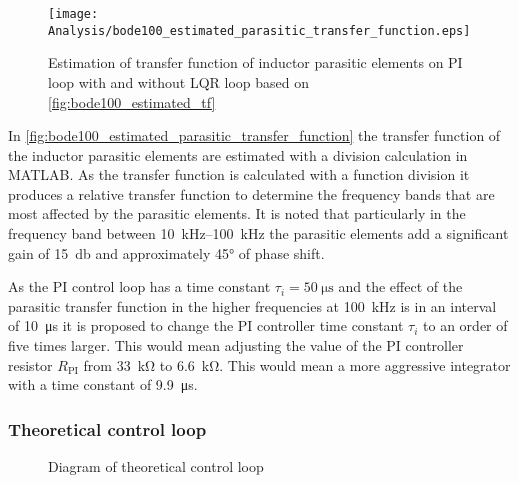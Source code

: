 \begin{figure}[htbp]
	\centering
	\texttt{[image: Analysis/bode100\_estimated\_parasitic\_transfer\_function.eps]}
	\caption{Estimation of transfer function of inductor parasitic elements on PI loop with and without LQR loop based on \autoref{fig:bode100_estimated_tf}}
	\label{fig:bode100_estimated_parasitic_transfer_function}
\end{figure}
In \autoref{fig:bode100_estimated_parasitic_transfer_function} the transfer function of the inductor parasitic elements are estimated with a division calculation in MATLAB. As the transfer function is calculated with a function division it produces a relative transfer function to determine the frequency bands that are most affected by the parasitic elements. It is noted that particularly in the frequency band between \SIrange[scientific-notation = engineering]{10}{100}{\kilo\hertz} the parasitic elements add a significant gain of \SI{15}{\decibel} and approximately \ang{45} of phase shift. 

As the PI control loop has a time constant $\tau_{i} = \SI{50}{\micro\second}$ and the effect of the parasitic transfer function in the higher frequencies at \SI{100}{\kilo\hertz} is in an interval of \SI{10}{\micro\second} it is proposed to change the PI controller time constant $\tau_{i}$ to an order of five times larger. This would mean adjusting the value of the PI controller resistor $R_{\mathrm{PI}}$ from \SI{33}{\kilo\ohm} to \SI{6.6}{\kilo\ohm}. This would mean a more aggressive integrator with a time constant of \SI{9.9}{\micro\second}.
\subsubsection{Theoretical control loop}

\begin{figure}[htbp]
	\centering
	
	\caption{Diagram of theoretical control loop}
	\label{fig:diagram_control_loop_theoretical}
\end{figure}

